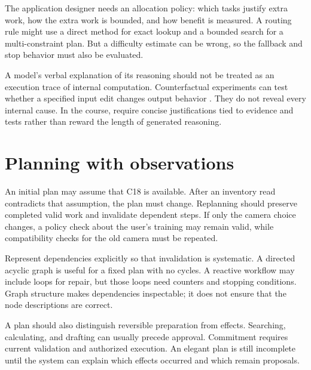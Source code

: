 The application designer needs an allocation policy: which tasks justify extra work, how the extra work is bounded, and how benefit is measured. A routing rule might use a direct method for exact lookup and a bounded search for a multi-constraint plan. But a difficulty estimate can be wrong, so the fallback and stop behavior must also be evaluated.

A model's verbal explanation of its reasoning should not be treated as an execution trace of internal computation. Counterfactual experiments can test whether a specified input edit changes output behavior \cite{chive}. They do not reveal every internal cause. In the course, require concise justifications tied to evidence and tests rather than reward the length of generated reasoning.

\section{Planning with observations}
An initial plan may assume that C18 is available. After an inventory read contradicts that assumption, the plan must change. Replanning should preserve completed valid work and invalidate dependent steps. If only the camera choice changes, a policy check about the user's training may remain valid, while compatibility checks for the old camera must be repeated.

Represent dependencies explicitly so that invalidation is systematic. A directed acyclic graph is useful for a fixed plan with no cycles. A reactive workflow may include loops for repair, but those loops need counters and stopping conditions. Graph structure makes dependencies inspectable; it does not ensure that the node descriptions are correct.

A plan should also distinguish reversible preparation from effects. Searching, calculating, and drafting can usually precede approval. Commitment requires current validation and authorized execution. An elegant plan is still incomplete until the system can explain which effects occurred and which remain proposals.

